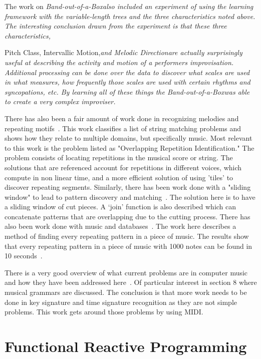 \documentclass[12pt]{ucthesis}
\begin{document}
The work on \em{Band-out-of-a-Box}\em also included an experiment of using the learning framework with the variable-length trees and the three characteristics noted above. The interesting conclusion drawn from the experiment is that these three characteristics, \em{Pitch Class, Intervallic Motion,\em and  \em{Melodic Direction}\em are actually surprisingly useful at describing the activity and motion of a performers improvisation. Additional processing can be done over the data to discover what scales are used in what measures, how frequently those scales are used with certain rhythms and syncopations, etc. By learning all of these things the \em{Band-out-of-a-Box}\em was able to create a very complex improviser.

There has also been a fair amount of work done in recognizing melodies and repeating motifs~\cite{MelodicRecognition}. This work classifies a list of string matching problems and shows how they relate to multiple domains, but specifically music. Most relevant to this work is the problem listed as "Overlapping Repetition Identification." The problem consists of locating repetitions in the musical score or string. The solutions that are referenced account for repetitions in different voices, which compute in non linear time, and a more efficient solution of using 'tiles' to discover repeating segments. Similarly, there has been work done with a "sliding window" to lead to pattern discovery and matching~\cite{slidingWindow}. The solution here is to have a sliding window of cut pieces. A `join' function is also described which can concatenate patterns that are overlapping due to the cutting process. There has also been work done with music and databases~\cite{musicDB}. The work here describes a method of finding every repeating pattern in a piece of music. The results show that every repeating pattern in a piece of music with 1000 notes can be found in 10 seconds~\cite{musicDB}.

There is a very good overview of what current problems are in computer music and how they have been addressed here~\cite{Gerhard}. Of particular interest in section 8 where musical grammars are discussed. The conclusion is that more work needs to be done in key signature and time signature recognition as they are not simple problems. This work gets around those problems by using MIDI.

\section{Functional Reactive Programming}
\label{rw:frp}

}
\end{document}
